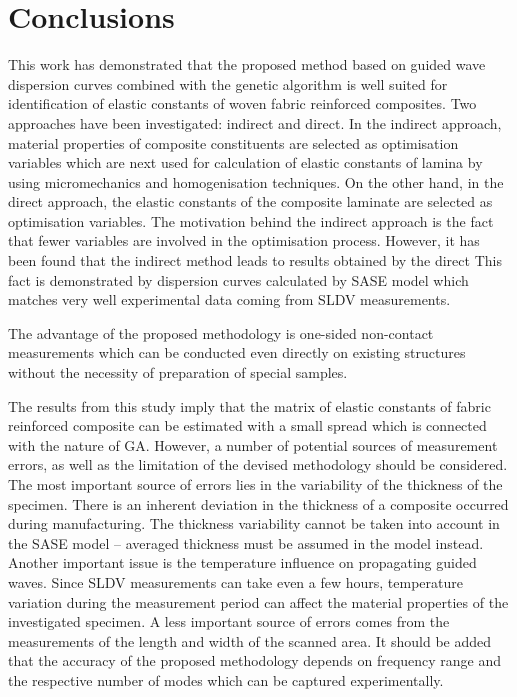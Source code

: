 \section{Conclusions}
		This work has demonstrated that the proposed method based on guided wave 
	dispersion curves combined with the genetic algorithm is well suited for identification 
	of elastic constants of woven fabric reinforced composites. Two approaches have 
	been investigated: indirect and direct.  In the indirect approach, material properties of 
	composite constituents are selected as optimisation variables which are next used 
	for calculation of elastic constants of lamina by using micromechanics and 
	homogenisation techniques. On the other hand, in the direct approach, the elastic 
	constants of the composite laminate are selected as optimisation variables. The 
	motivation behind the indirect approach is the fact that fewer variables are involved in 
	the optimisation process. However, it has been found that  the indirect method leads to  
	results   obtained by  the direct   This fact is demonstrated by  
	dispersion curves calculated by  SASE model which matches very well  
	experimental data coming from  SLDV measurements. 
	
	The advantage of the proposed methodology is one-sided non-contact measurements  which can be conducted even directly on existing structures without the necessity of preparation of special samples.
	
	The results from this study imply that the matrix of elastic constants of fabric reinforced composite can be estimated with a  small spread which is connected with the nature of GA. However, a number of potential sources of measurement errors, as well as the limitation of the devised methodology should be considered. The most important source of errors lies in the variability of the thickness of the specimen. There is an inherent deviation in the thickness of a composite occurred during manufacturing. The thickness variability cannot be taken into account in the SASE model -- averaged thickness must be assumed in the model instead. Another important issue is the temperature influence on propagating guided waves. Since SLDV measurements can take even a few hours, temperature variation during the measurement period can affect the material properties of the investigated specimen. A less important source of errors comes from the measurements of the length and width of the scanned area. It should be added that the accuracy of the proposed methodology depends on  frequency range and the respective number of modes which can be captured experimentally.
	

